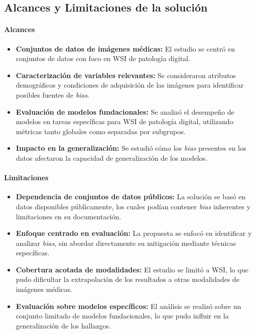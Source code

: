 \subsection{Alcances y Limitaciones de la solución}

\paragraph{Alcances}

\begin{itemize}
\item \textbf{Conjuntos de datos de imágenes médicas:} El estudio se centró en conjuntos de datos con foco en WSI de patología digital.
\item \textbf{Caracterización de variables relevantes:} Se consideraron atributos demográficos y condiciones de adquisición de las imágenes para identificar posibles fuentes de \textit{bias}.
\item \textbf{Evaluación de modelos fundacionales:} Se analizó el desempeño de modelos en tareas específicas para WSI de patología digital, utilizando métricas tanto globales como separadas por subgrupos.
\item \textbf{Impacto en la generalización:} Se estudió cómo los \textit{bias} presentes en los datos afectaron la capacidad de generalización de los modelos.
\end{itemize}

\paragraph{Limitaciones}

\begin{itemize}
\item \textbf{Dependencia de conjuntos de datos públicos:} La solución se basó en datos disponibles públicamente, los cuales podían contener \textit{bias} inherentes y limitaciones en su documentación.
\item \textbf{Enfoque centrado en evaluación:} La propuesta se enfocó en identificar y analizar \textit{bias}, sin abordar directamente su mitigación mediante técnicas específicas.
\item \textbf{Cobertura acotada de modalidades:} El estudio se limitó a WSI, lo que pudo dificultar la extrapolación de los resultados a otras modalidades de imágenes médicas.
\item \textbf{Evaluación sobre modelos específicos:} El análisis se realizó sobre un conjunto limitado de modelos fundacionales, lo que pudo influir en la generalización de los hallazgos.
\end{itemize}

